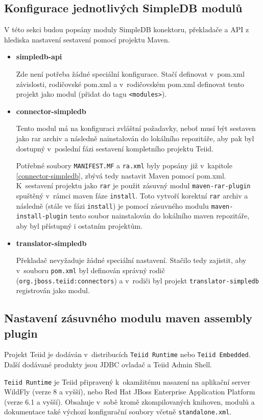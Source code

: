 \documentclass[oneside,12pt]{fithesis2}
\begin{document}
\subsection{Konfigurace jednotlivých SimpleDB modulů}
\label{konfigurace}
V této sekci budou popsány moduly SimpleDB konektoru, překladače a API z hlediska nastavení sestavení pomocí projektu Maven.
\begin{itemize}
 \item \textbf{simpledb-api}
 
 Zde není potřeba žádné speciální konfigurace. Stačí definovat v~pom.xml závislosti, rodičovské pom.xml a v~rodičovském pom.xml definovat tento projekt jako modul (přidat do tagu \texttt{<modules>}).
 \item \textbf{connector-simpledb}
 
 Tento modul má na konfiguraci zvláštní požadavky, neboť musí být sestaven jako rar archiv a následně nainstalován do lokálního repozitáře, aby pak byl dostupný v~poslední fázi sestavení kompletního projektu Teiid.
 
 Potřebné soubory \texttt{MANIFEST.MF} a \texttt{ra.xml} byly popsány již v~kapitole \ref{connector-simpledb}, zbývá tedy nastavit Maven pomocí pom.xml.
 K~sestavení projektu jako \texttt{rar} je použit zásuvný modul \texttt{maven-rar-plugin} spuštěný v~rámci maven fáze \texttt{install}. Toto vytvoří korektní \texttt{rar} archiv a následně (stále ve fázi \texttt{install}) je pomocí zásuvného modulu \texttt{maven-install-plugin} tento soubor nainstalován do lokálního maven repozitáře, aby byl přístupný i ostatním projektům.
 
 \item \textbf{translator-simpledb}
 
 Překladač nevyžaduje žádné speciální nastavení. Stačilo tedy zajistit, aby v~souboru \texttt{pom.xml} byl definován správný rodič (\texttt{org.jboss.teiid:connectors}) a v~rodiči byl projekt \texttt{translator\allowbreak -simpledb} registrován jako modul.
\end{itemize}

\subsection{Nastavení zásuvného modulu maven assembly plugin}
Projekt Teiid je dodáván v~distribucích \texttt{Teiid Runtime} nebo \texttt{Teiid Embedded}. Další dodávané produkty jsou JDBC ovladač a Teiid Admin Shell. 

\texttt{Teiid Runtime} je Teiid připravený k~okamžitému nasazení na aplikační server WildFly (verze 8 a vyšší), nebo Red Hat JBoss Enterprise Application Platform (verze 6.1 a vyšší). Obsahuje v~sobě kromě zkompilovaných knihoven, modulů a dokumentace také výchozí konfigurační soubory včetně \texttt{standalone.xml}.
\end{document}
